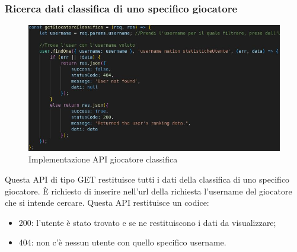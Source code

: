 \subsubsection{Ricerca dati classifica di uno specifico giocatore}
\begin{figure}[!h]
\centering
\includegraphics[scale=0.4]{images/api_giocatore_classifica.jpg}
\caption{Implementazione API giocatore classifica}
\label{fig:api_giocatore_classifica}
\end{figure}
\noindent
Questa API di tipo GET restituisce tutti i dati della classifica di uno specifico giocatore. È richiesto di inserire nell'url della richiesta l'username del giocatore che si intende cercare.
Questa API restituisce un codice:
\begin{itemize}
    \item 200: l'utente è stato trovato e se ne restituiscono i dati da visualizzare;
    \item 404: non c'è nessun utente con quello specifico username.
\end{itemize}


